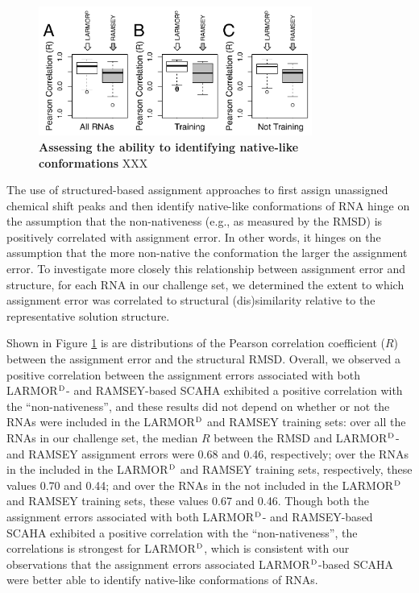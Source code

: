 \documentclass[journal=jcisd8,manuscript=article,layout=onecolumn]{achemso}
\begin{document}
\begin{figure}[h!]
  \centering
       \includegraphics[width=0.8\textwidth]{figure_3}
  \caption{\textbf{Assessing the ability to identifying native-like conformations} XXX}
  \label{fig:correlations}
\end{figure}

The use of structured-based assignment approaches to first assign unassigned chemical shift peaks and then identify native-like conformations of RNA hinge on the assumption that the non-nativeness (e.g., as measured by the RMSD) is positively correlated with assignment error. In other words, it hinges on the assumption that the more non-native the conformation the larger the assignment error. To investigate more closely this relationship between assignment error and structure, for each RNA in our challenge set, we determined the extent to which assignment error was correlated to structural (dis)similarity relative to the representative solution structure. 

Shown in Figure \ref{fig:correlations} is are distributions of the Pearson correlation coefficient ($R$) between the assignment error and the structural RMSD. Overall, we observed a positive correlation between the assignment errors associated with both LARMOR$^{\rm D}$- and RAMSEY-based SCAHA exhibited a positive correlation with the ``non-nativeness'', and these results did not depend on whether or not the RNAs were included in the LARMOR$^{\rm D}$ and RAMSEY training sets: over all the RNAs in our challenge set, the median $R$ between the RMSD and LARMOR$^{\rm D}$- and RAMSEY assignment errors were 0.68  and 0.46, respectively;  over the RNAs in the included in the LARMOR$^{\rm D}$ and RAMSEY training sets, respectively, these values 0.70 and  0.44; and over the RNAs in the not included in the LARMOR$^{\rm D}$ and RAMSEY training sets, these values 0.67 and 0.46. Though both the assignment errors associated with both LARMOR$^{\rm D}$- and RAMSEY-based SCAHA exhibited a positive correlation with the ``non-nativeness'', the correlations is strongest for LARMOR$^{\rm D}$, which is consistent with our observations that the assignment errors associated LARMOR$^{\rm D}$-based SCAHA were better able to identify native-like conformations of RNAs.
\end{document}
